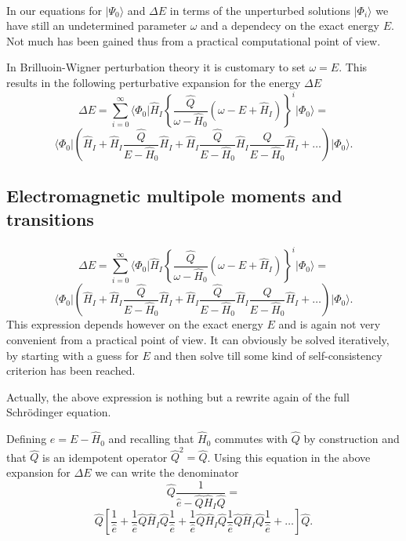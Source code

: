 \documentclass[%
twoside,                 %
final,                   %
10pt]{article}
\begin{document}
\paragraph{}
In our equations for $\vert \Psi_0\rangle$ and $\Delta E$ in terms of the unperturbed
solutions $\vert \Phi_i\rangle$  we have still an undetermined parameter $\omega$
and a dependecy on the exact energy $E$. Not much has been gained thus from a practical computational point of view. 

In Brilluoin-Wigner perturbation theory it is customary to set $\omega=E$. This results in the following perturbative expansion for the energy $\Delta E$
\[
\Delta E=\sum_{i=0}^{\infty}\langle \Phi_0\vert \hat{H}_I\left\{\frac{\hat{Q}}{\omega-\hat{H}_0}\left(\omega-E+\hat{H}_I\right)\right\}^i\vert \Phi_0\rangle=
\]
\[
\langle \Phi_0\vert \left(\hat{H}_I+\hat{H}_I\frac{\hat{Q}}{E-\hat{H}_0}\hat{H}_I+
\hat{H}_I\frac{\hat{Q}}{E-\hat{H}_0}\hat{H}_I\frac{\hat{Q}}{E-\hat{H}_0}\hat{H}_I+\dots\right)\vert \Phi_0\rangle. 
\]



\subsection*{Electromagnetic multipole moments and transitions}

\paragraph{}
\[
\Delta E=\sum_{i=0}^{\infty}\langle \Phi_0\vert \hat{H}_I\left\{\frac{\hat{Q}}{\omega-\hat{H}_0}\left(\omega-E+\hat{H}_I\right)\right\}^i\vert \Phi_0\rangle=\]
\[
\langle \Phi_0\vert \left(\hat{H}_I+\hat{H}_I\frac{\hat{Q}}{E-\hat{H}_0}\hat{H}_I+
\hat{H}_I\frac{\hat{Q}}{E-\hat{H}_0}\hat{H}_I\frac{\hat{Q}}{E-\hat{H}_0}\hat{H}_I+\dots\right)\vert \Phi_0\rangle. 
\]
This expression depends however on the exact energy $E$ and is again not very convenient from a practical point of view. It can obviously be solved iteratively, by starting with a guess for  $E$ and then solve till some kind of self-consistency criterion has been reached. 

Actually, the above expression is nothing but a rewrite again of the full Schr\"odinger equation.


Defining $e=E-\hat{H}_0$ and recalling that $\hat{H}_0$ commutes with 
$\hat{Q}$ by construction and that $\hat{Q}$ is an idempotent operator
$\hat{Q}^2=\hat{Q}$. 
Using this equation in the above expansion for $\Delta E$ we can write the denominator 
\[
\hat{Q}\frac{1}{\hat{e}-\hat{Q}\hat{H}_I\hat{Q}}=
\]
\[
\hat{Q}\left[\frac{1}{\hat{e}}+\frac{1}{\hat{e}}\hat{Q}\hat{H}_I\hat{Q}
\frac{1}{\hat{e}}+\frac{1}{\hat{e}}\hat{Q}\hat{H}_I\hat{Q}
\frac{1}{\hat{e}}\hat{Q}\hat{H}_I\hat{Q}\frac{1}{\hat{e}}+\dots\right]\hat{Q}.
\]
\end{document}
